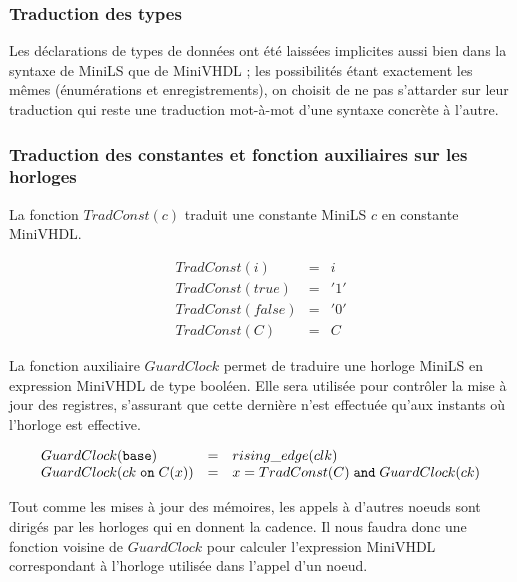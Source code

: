 \documentclass[a4paper]{article}
\newcommand{\mybox}[1]{\mbox{\tt{#1}}}
\newcommand{\Base}[0]{\mybox{base}}
\newcommand{\On}[3]{#1 \; \mybox{on} \; #2 (#3)}
\begin{document}
\subsubsection{Traduction des types}

Les d\'eclarations de types de donn\'ees ont \'et\'e laiss\'ees implicites aussi bien dans
la syntaxe de MiniLS que de MiniVHDL ; les possibilit\'es \'etant exactement les
m\^emes (\'enum\'erations et enregistrements), on choisit de ne pas s'attarder sur
leur traduction qui reste une traduction mot-\`a-mot d'une syntaxe concr\`ete \`a
l'autre.

\subsubsection{Traduction des constantes et fonction auxiliaires sur les horloges}

La fonction $TradConst(c)$ traduit une constante MiniLS $c$ en constante
MiniVHDL.

\newcommand{\TradC}[1]{TradConst(#1)}

\[
\begin{array}{lcl}
  \TradC{i} & = & i \\
  \TradC{true} & = & '1' \\
  \TradC{false} & = & '0' \\
  \TradC{C} & = & C
\end{array}
\]

La fonction auxiliaire $GuardClock$ permet de traduire une horloge MiniLS en
expression MiniVHDL de type bool\'een. Elle sera utilis\'ee pour contr\^oler la
mise \`a jour des registres, s'assurant que cette derni\`ere n'est effectu\'ee
qu'aux instants o\`u l'horloge est effective.

\newcommand{\GEC}[1]{GuardClock(#1)}

\[
\begin{array}{lcl}
  \GEC{\Base} & = & rising\_edge(clk) \\
  \GEC{\On{ck}{C}{x}} & = & x = \TradC{C} \; \mathtt{and} \; \GEC{ck}
\end{array}
\]

Tout comme les mises \`a jour des m\'emoires, les appels \`a d'autres noeuds
sont dirig\'es par les horloges qui en donnent la cadence. Il nous faudra donc
une fonction voisine de $GuardClock$ pour calculer l'expression MiniVHDL
correspondant \`a l'horloge utilis\'ee dans l'appel d'un noeud.

\newcommand{\EC}[1]{ExpClock(#1)}
\end{document}
